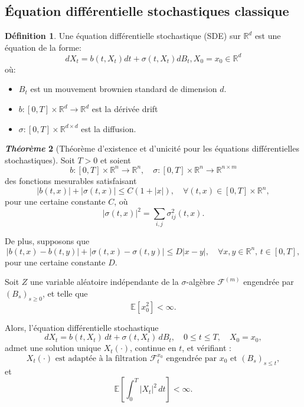 \documentclass[12pt,a4paper,twoside]{book}%
\theoremstyle{definition}
\newtheorem{dfn}{Définition}[section]
\newtheorem{thm}[dfn]{\textit{Théorème}}
\numberwithin{equation}{section}
\begin{document}
\subsection{Équation différentielle stochastiques classique}
\begin{dfn}
	Une équation différentielle stochastique (SDE) sur $\mathbb{R}^d$ est une équation de la forme:
	\begin{equation}
		dX_t = b(t,X_t)dt + \sigma(t,X_t)dB_t, X_0 = x_0\in\mathbb{R}^d
	\end{equation}
	où:
	\begin{itemize}
		\item $B_t$ est un mouvement brownien standard de dimension $d$.
		\item $b:[0,T]\times\mathbb{R}^d\longrightarrow\mathbb{R}^d$ est la dérivée drift
		\item $\sigma:[0,T]\times\mathbb{R}^{d\times d}$ est la diffusion.
	\end{itemize}
\end{dfn}
\begin{thm}[Théorème d’existence et d’unicité pour les équations différentielles stochastiques]
	Soit $T > 0$ et soient 
	\[
	b : [0,T] \times \mathbb{R}^n \to \mathbb{R}^n, 
	\quad 
	\sigma : [0,T] \times \mathbb{R}^n \to \mathbb{R}^{n \times m}
	\]
	des fonctions mesurables satisfaisant
	\begin{equation} \label{eq:lin_growth}
		|b(t,x)| + |\sigma(t,x)| \leq C(1+|x|), 
		\quad \forall (t,x) \in [0,T]\times \mathbb{R}^n,
	\end{equation}
	pour une certaine constante $C$, où 
	\[
	|\sigma(t,x)|^2 = \sum_{i,j} \sigma_{ij}^2(t,x).
	\]
	
	De plus, supposons que
	\begin{equation} \label{eq:lipschitz}
		|b(t,x)-b(t,y)| + |\sigma(t,x)-\sigma(t,y)| \leq D |x-y|, 
		\quad \forall x,y \in \mathbb{R}^n, \, t \in [0,T],
	\end{equation}
	pour une certaine constante $D$.
	
	Soit $Z$ une variable aléatoire indépendante de la $\sigma$-algèbre 
	$\mathcal{F}^{(m)}$ engendrée par $(B_s)_{s \geq 0}$, et telle que
	\[
	\mathbb{E}[x_0^2] < \infty.
	\]
	
	Alors, l’équation différentielle stochastique
	\[
	dX_t = b(t,X_t)\,dt + \sigma(t,X_t)\,dB_t, 
	\quad 0 \leq t \leq T, 
	\quad X_0 = x_0,
	\]
	admet une solution unique $X_t(\cdot)$, continue en $t$, et vérifiant :
	\begin{equation}
		X_t(\cdot) \text{ est adaptée à la filtration } 
		\mathcal{F}^{x_0}_t \text{ engendrée par } x_0 \text{ et } (B_s)_{s \leq t},
	\end{equation}
	et
	\begin{equation} 
		\mathbb{E}\!\left[\int_0^T |X_t|^2 \, dt\right] < \infty.
	\end{equation}
\end{thm}
\end{document}

